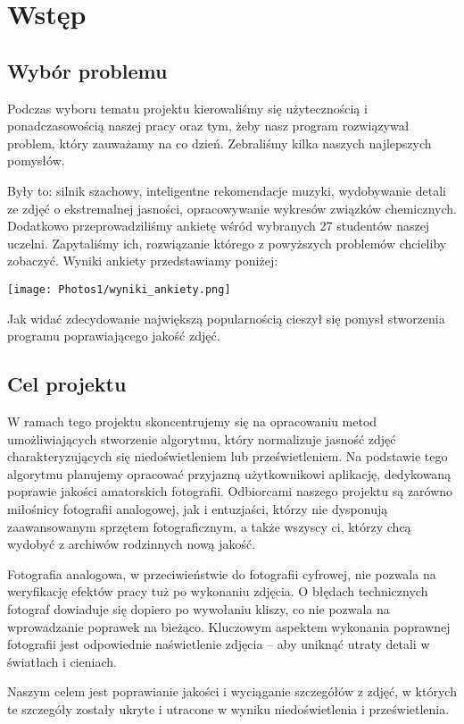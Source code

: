 \documentclass[]{mwart}
\begin{document}
\section{Wstęp}
\subsection{Wybór problemu}
Podczas wyboru tematu projektu kierowaliśmy się użytecznością
i ponadczasowością naszej pracy oraz tym, żeby nasz program
rozwiązywał problem,  który zauważamy na co dzień. Zebraliśmy
kilka naszych najlepszych pomysłów.

Były to: silnik szachowy, inteligentne
rekomendacje muzyki, wydobywanie detali ze zdjęć o ekstremalnej
jasności, opracowywanie wykresów związków chemicznych.
Dodatkowo przeprowadziliśmy ankietę wśród wybranych 27
studentów naszej uczelni. Zapytaliśmy ich, rozwiązanie
którego z powyższych problemów chcieliby zobaczyć.
Wyniki ankiety przedstawiamy poniżej:

\texttt{[image: Photos1/wyniki\_ankiety.png]}

Jak widać zdecydowanie największą popularnością
cieszył się pomysł stworzenia programu poprawiającego jakość zdjęć.

\subsection{Cel projektu}
W ramach tego projektu skoncentrujemy się na opracowaniu metod
umożliwiających stworzenie algorytmu, który normalizuje jasność
zdjęć charakteryzujących się niedoświetleniem lub
prześwietleniem. Na podstawie tego algorytmu planujemy opracować
przyjazną użytkownikowi aplikację, dedykowaną poprawie jakości
amatorskich fotografii. Odbiorcami naszego projektu są zarówno
miłośnicy fotografii analogowej, jak i entuzjaści, którzy nie
dysponują zaawansowanym sprzętem fotograficznym, a także
wszyscy ci, którzy chcą wydobyć z archiwów rodzinnych
nową jakość.

Fotografia analogowa, w przeciwieństwie do fotografii cyfrowej,
nie pozwala na weryfikację efektów pracy tuż po wykonaniu zdjęcia.
O błędach technicznych fotograf dowiaduje się dopiero po wywołaniu
kliszy, co nie pozwala na wprowadzanie poprawek na bieżąco.
Kluczowym aspektem wykonania poprawnej fotografii jest odpowiednie
naświetlenie zdjęcia -- aby uniknąć utraty detali w światłach i cieniach.

Naszym celem jest poprawianie jakości i wyciąganie szczegółów
z zdjęć, w których te szczegóły zostały ukryte i utracone w wyniku
niedoświetlenia i prześwietlenia.
\end{document}
